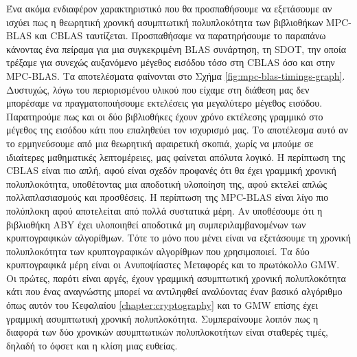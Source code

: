 Ένα ακόμα ενδιαφέρον χαρακτηριστικό που θα προσπαθήσουμε να εξετάσουμε αν ισχύει πως η θεωρητική χρονική ασυμπτωτική πολυπλοκότητα των βιβλιοθήκων MPC-BLAS και CBLAS ταυτίζεται. Προσπαθήσαμε να παρατηρήσουμε το παραπάνω κάνοντας ένα πείραμα για μια συγκεκριμένη BLAS συνάρτηση, τη SDOT, την οποία τρέξαμε για συνεχώς αυξανόμενο μέγεθος εισόδου τόσο στη CBLAS όσο και στην MPC-BLAS. Τα αποτελέσματα φαίνονται στο Σχήμα \ref{fig:mpc-blas-timings-graph}. Δυστυχώς, λόγω του περιορισμένου υλικού που είχαμε στη διάθεση μας δεν μπορέσαμε να πραγματοποιήσουμε εκτελέσεις για μεγαλύτερο μέγεθος εισόδου. Παρατηρούμε πως και οι δύο βιβλιοθήκες έχουν χρόνο εκτέλεσης γραμμικό στο μέγεθος της εισόδου κάτι που επαληθεύει τον ισχυρισμό μας. Το αποτέλεσμα αυτό αν το ερμηνεύσουμε από μια θεωρητική αφαιρετική σκοπιά, χωρίς να μπούμε σε ιδιαίτερες μαθηματικές λεπτομέρειες, μας φαίνεται απόλυτα λογικό. Η περίπτωση της CBLAS είναι πιο απλή, αφού είναι σχεδόν προφανές ότι θα έχει γραμμική χρονική πολυπλοκότητα, υποθέτοντας μια αποδοτική υλοποίηση της, αφού εκτελεί απλώς πολλαπλασιασμούς και προσθέσεις. Η περίπτωση της MPC-BLAS είναι λίγο πιο πολύπλοκη αφού αποτελείται από πολλά συστατικά μέρη. Αν υποθέσουμε ότι η βιβλιοθήκη ABY έχει υλοποιηθεί αποδοτικά μη συμπεριλαμβανομένων των κρυπτογραφικών αλγορίθμων. Τότε το μόνο που μένει είναι να εξετάσουμε τη χρονική πολυπλοκότητα των κρυπτογραφικών αλγορίθμων που χρησιμοποιεί. Τα δύο κρυπτογραφικά μέρη είναι οι Ανυποψίαστες Μεταφορές και το πρωτόκολλο GMW. Οι πρώτες, παρότι είναι αργές, έχουν γραμμική ασυμπτωτική χρονική πολυπλοκότητα κάτι που ένας αναγνώστης μπορεί να αντιληφθεί αναλύοντας έναν βασικό αλγόριθμο όπως αυτόν του Κεφαλαίου \ref{chapter:cryptography} και το GMW επίσης έχει γραμμική ασυμπτωτική χρονική πολυπλοκότητα. Συμπεραίνουμε λοιπόν πως η διαφορά των δύο χρονικών ασυμπτωτικών πολυπλοκοτήτων είναι σταθερές τιμές, δηλαδή το όφσετ και η κλίση μιας ευθείας.

